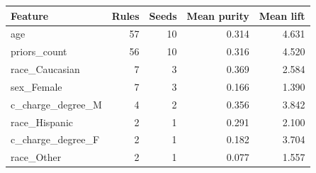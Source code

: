 \begin{tabular}{lrrrr}
\hline
Feature & Rules & Seeds & Mean purity & Mean lift \\
\hline
age & 57 & 10 & 0.314 & 4.631 \\
priors\_count & 56 & 10 & 0.316 & 4.520 \\
race\_Caucasian & 7 & 3 & 0.369 & 2.584 \\
sex\_Female & 7 & 3 & 0.166 & 1.390 \\
c\_charge\_degree\_M & 4 & 2 & 0.356 & 3.842 \\
race\_Hispanic & 2 & 1 & 0.291 & 2.100 \\
c\_charge\_degree\_F & 2 & 1 & 0.182 & 3.704 \\
race\_Other & 2 & 1 & 0.077 & 1.557 \\
\hline
\end{tabular}